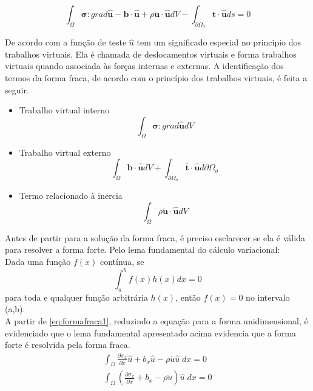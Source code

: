 \begin{equation} \label{eq:formafracafinal}
	\int_{\Omega} \boldsymbol{\sigma} : grad \boldsymbol{\hat{u}} -  \boldsymbol{b} \cdot \boldsymbol{\hat{u}} +  \rho\ddot{\boldsymbol{u}} \cdot \boldsymbol{\hat{u}}  dV - \int_{\partial \Omega_{\sigma}} \boldsymbol{\overline{t}} \cdot \boldsymbol{\hat{u}} ds = 0 
\end{equation}

De acordo com \cite{Paulo} a função de teste $ \hat{u} $ tem um significado especial no principio dos trabalhos virtuais. Ela é chamada de deslocamentos virtuais e forma trabalhos virtuais quando associada às forças internas e externas. A identificação dos termos da forma fraca, de acordo com o princípio dos trabalhos virtuais, é feita a seguir.
\begin{itemize}
	\item Trabalho virtual interno
	\begin{equation}
		\int_{\Omega} \boldsymbol{\sigma} : grad\boldsymbol{\hat{u}} dV
	\end{equation}
	\item Trabalho virtual externo
	\begin{equation}
		\int_{\Omega} \boldsymbol{b} \cdot \boldsymbol{\hat{u}} dV + \int_{\partial \Omega_{\sigma}} \boldsymbol{\overline{t}} \cdot \boldsymbol{\hat{u}} d\partial \Omega_{\sigma}
	\end{equation}
	\item Termo relacionado à inercia
	\begin{equation}
		\int_{\Omega} \rho \ddot{\boldsymbol{u}} \cdot \boldsymbol{\hat{u}}  dV
	\end{equation}
\end{itemize}

Antes de partir para a solução da forma fraca, é preciso esclarecer se ela é válida para resolver a forma forte. Pelo lema fundamental do cálculo variacional:\\
Dada uma função $ f(x) $ contínua, se
\begin{equation}
\int_{a}^{b} f(x) h(x) dx = 0
\end{equation}
para toda e qualquer função arbitrária $ h(x) $,
então $ f(x) = 0 $ no intervalo (a,b). \\

A partir de \ref{eq:formafraca1}, reduzindo a equação para a forma unidimensional, é evidenciado que o lema fundamental apresentado acima evidencia que a forma forte é resolvida pela forma fraca.
\begin{align}
	\int_{\Omega} \frac{\partial \sigma_x}{\partial x} \hat{u} + b_x \hat{u} - \rho\ddot{u} \hat{u} \; dx = 0 \\
	\int_{\Omega} (\frac{\partial \sigma_x}{\partial x}  + b_x - \rho\ddot{u} )\hat{u} \; dx = 0
\end{align}

